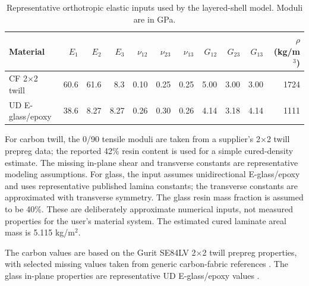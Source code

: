\begin{table}[htbp]
\centering
\caption{Representative orthotropic elastic inputs used by the layered-shell model. Moduli are in GPa.}
\label{tab:ply-properties}
\begin{tabular}{lrrrrrrrrrr}
\toprule
Material & $E_1$ & $E_2$ & $E_3$ & $\nu_{12}$ & $\nu_{23}$ & $\nu_{13}$ & $G_{12}$ & $G_{23}$ & $G_{13}$ & $\rho$ (kg/m$^3$) \\
\midrule
CF 2$\times$2 twill & 60.6 & 61.6 & 8.3 & 0.10 & 0.25 & 0.25 & 5.00 & 3.00 & 3.00 & 1724 \\
UD E-glass/epoxy & 38.6 & 8.27 & 8.27 & 0.26 & 0.30 & 0.26 & 4.14 & 3.18 & 4.14 & 1111 \\
\bottomrule
\end{tabular}
\end{table}

For carbon twill, the 0/90 tensile moduli are taken from a supplier's 2$\times$2
twill prepreg data; the reported 42\% resin content is used for a simple
cured-density estimate. The missing in-plane shear and transverse constants
are representative modeling assumptions. For glass, the input assumes
unidirectional E-glass/epoxy and uses representative published lamina
constants; the transverse constants are approximated with transverse symmetry.
The glass resin mass fraction is assumed to be 40\%. These are deliberately
approximate numerical inputs, not measured properties for the user's material
system. The estimated cured laminate areal mass is 5.115 kg/m$^2$.

The carbon values are based on the Gurit SE84LV 2$\times$2 twill prepreg
properties, with selected missing values taken from generic carbon-fabric
references \cite{guritSE84LV,performanceCarbonGeneric}. The glass in-plane
properties are representative UD E-glass/epoxy values \cite{glassUDLamina}.
